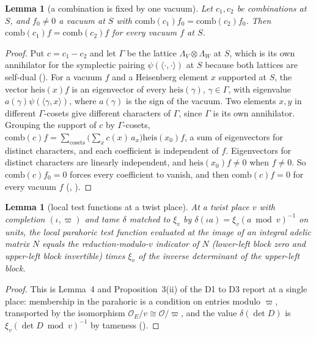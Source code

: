 \documentclass[11pt]{article}
\newcommand{\Ok}{\mathcal O}
\newcommand{\OEr}{\mathcal O_E}
\newtheorem{lemma}[theorem]{Lemma}
\theoremstyle{definition}
\theoremstyle{remark}
\begin{document}
\begin{lemma}[a combination is fixed by one vacuum]\label{lem:vac}
Let $c_1,c_2$ be combinations at $S$, and $f_0\ne0$ a vacuum at $S$ with $\mathrm{comb}(c_1)f_0=\mathrm{comb}(c_2)f_0$. Then $\mathrm{comb}(c_1)f=\mathrm{comb}(c_2)f$ for every vacuum $f$ at $S$.
\end{lemma}

\begin{proof}
Put $c=c_1-c_2$ and let $\Gamma$ be the lattice $\Lambda_V\otimes\Lambda_W$ at $S$, which is its own annihilator for the symplectic pairing $\psi(\langle\cdot,\cdot\rangle)$ at $S$ because both lattices are self-dual (). For a vacuum $f$ and a Heisenberg element $x$ supported at $S$, the vector $\mathrm{heis}(x)f$ is an eigenvector of every $\mathrm{heis}(\gamma)$, $\gamma\in\Gamma$, with eigenvalue $a(\gamma)\psi(\langle\gamma,x\rangle)$, where $a(\gamma)$ is the sign of the vacuum. Two elements $x,y$ in different $\Gamma$-cosets give different characters of $\Gamma$, since $\Gamma$ is its own annihilator. Grouping the support of $c$ by $\Gamma$-cosets, $\mathrm{comb}(c)f=\sum_{\text{cosets}}\big(\sum_{x}c(x)\,a_x\big)\mathrm{heis}(x_0)f$, a sum of eigenvectors for distinct characters, and each coefficient is independent of $f$. Eigenvectors for distinct characters are linearly independent, and $\mathrm{heis}(x_0)f\ne0$ when $f\ne0$. So $\mathrm{comb}(c)f_0=0$ forces every coefficient to vanish, and then $\mathrm{comb}(c)f=0$ for every vacuum $f$ (, ).
\end{proof}

\begin{lemma}[local test functions at a twist place]\label{lem:parphi}
At a twist place $v$ with completion $(\iota,\varpi)$ and tame $\delta$ matched to $\xi_v$ by $\delta(\iota a)=\xi_v(a\bmod v)^{-1}$ on units, the local parahoric test function evaluated at the image of an integral adelic matrix $N$ equals the reduction-modulo-$v$ indicator of $N$ (lower-left block zero and upper-left block invertible) times $\xi_v$ of the inverse determinant of the upper-left block.
\end{lemma}

\begin{proof}
This is Lemma~4 and Proposition~3(ii) of the D1 to D3 report at a single place: membership in the parahoric is a condition on entries modulo $\varpi$, transported by the isomorphism $\OEr/v\cong\Ok/\varpi$, and the value $\delta(\det D)$ is $\xi_v(\det D\bmod v)^{-1}$ by tameness ().
\end{proof}
\end{document}
